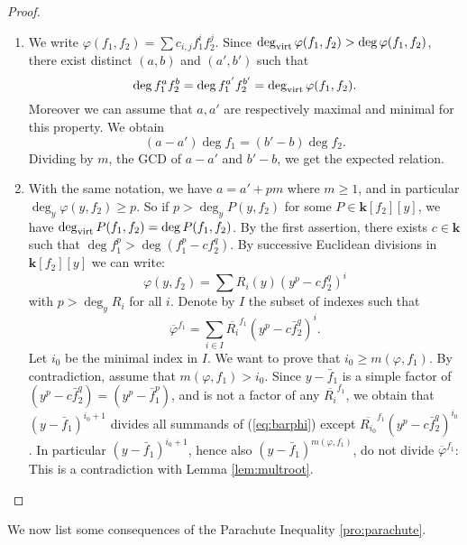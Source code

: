 \documentclass[reqno,oneside,11pt]{amsart}
\theoremstyle{plain}
\theoremstyle{definition}
\newcommand{\K}{\mathbf{k}}
\renewcommand{\phi}{\varphi}
\newcommand{\dvirt}{\deg_{\text{\rm virt}}}
\newcommand{\topcomp}[2]{\overline{#1}^{#2}}
\renewcommand{\ge}{\geqslant}
\begin{document}
\begin{proof}
\begin{enumerate}[wide]
\item
We write $\phi(f_1,f_2) = \sum c_{i,j}f_1^if_2^j$.
Since $\dvirt \phi(f_1,f_2) > \deg \phi(f_1,f_2)$, there exist distinct $(a,b)$ and $(a',b')$ such that
$$\deg f_1^a f_2^b = \deg f_1^{a'}f_2^{b'} = \dvirt \phi(f_1,f_2).$$
Moreover we can assume that $a, a'$ are respectively maximal and minimal for this property.
We obtain
$$(a-a')\deg f_1 = (b' - b) \deg f_2.$$
Dividing by $m$, the GCD of $a-a'$ and $b'-b$, we get the expected relation.

\item With the same notation, we have $a = a' + pm$ where $m \ge 1$, and in particular $\deg_y \phi(y,f_2) \ge p$.
So if $p > \deg_y P(y,f_2)$ for some $P \in \K[f_2][y]$, we have $\dvirt P(f_1,f_2) = \deg P(f_1,f_2)$.
By the first assertion, there exists $c \in \K$ such that $\deg f_1^p > \deg \left(f_1^p - cf_2^q\right)$.
By successive Euclidean divisions in $\K[f_2][y]$ we can write:
$$\phi(y,f_2) = \sum R_i(y) \left(y^p - c f_2^q\right)^i$$
with $p > \deg_y R_i$ for all $i$.
Denote by $I$ the subset of indexes such that
\begin{equation} \label{eq:barphi}
\topcomp{\phi}{f_1}  = \sum_{i \in I} \topcomp{R_i}{f_1} \left(y^p - c \bar f_2^q\right)^i.
\end{equation}
Let $i_0$ be the minimal index in $I$.
We want to prove that $i_0 \ge m(\phi,f_1)$.
By contradiction, assume that $m(\phi,f_1) > i_0$.
Since $y - \bar f_1$ is a simple factor of $(y^p - c \bar f_2^q) = (y^p - \bar f_1^p)$, and is not a factor of any $\topcomp{R_i}{f_1}$, we obtain that $(y - \bar f_1)^{i_0+1}$ divides all summands of (\ref{eq:barphi}) except $\topcomp{R_{i_0}}{f_1} (y^p - c \bar f_2^q)^{i_0}$.
In particular $(y - \bar f_1)^{i_0+1}$, hence also  $(y - \bar f_1)^{m(\phi,f_1)}$, do not divide $\topcomp{\phi}{f_1}$: This is a contradiction with Lemma \ref{lem:multroot}.
\qedhere
\end{enumerate}
\end{proof}

We now list some consequences of the Parachute Inequality \ref{pro:parachute}.
\end{document}
